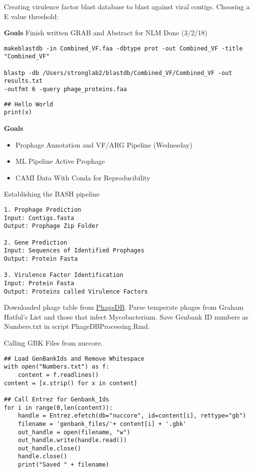 \documentclass[idxtotoc,hyperref,openany,oneside]{labbook} %
\begin{document}
Creating virulence factor blast database to blast against viral contigs. Choosing a E value threshold:


\textbf{Goals}
Finish written GRAB and Abstract for NLM
Done (3/2/18)


\begin{verbatim}
makeblastdb -in Combined_VF.faa -dbtype prot -out Combined_VF -title "Combined_VF"

blastp -db /Users/stronglab2/blastdb/Combined_VF/Combined_VF -out results.txt
-outfmt 6 -query phage_proteins.faa
\end{verbatim}


\begin{lstlisting}
## Hello World 
print(x)
\end{lstlisting} 






\textbf{Goals}
\begin{itemize}
\item Prophage Annotation and VF/ARG Pipeline (Wednesday)
\item ML Pipeline Active Prophage
\item CAMI Data With Conda for Reproducibility
\end{itemize}

Establishing the BASH pipeline

\begin{verbatim}
1. Prophage Prediction
Input: Contigs.fasta
Output: Prophage Zip Folder

2. Gene Prediction
Input: Sequences of Identified Prophages
Output: Protein Fasta

3. Virulence Factor Identification
Input: Protein Fasta
Output: Proteins called Virulence Factors

\end{verbatim}



Downloaded phage table from \href{http://phagesdb.org/data/}{PhageDB}. Parse temperate phages from Graham Hatful's List and those that infect Mycobacterium. Save Genbank ID numbers as Numbers.txt in script PhageDBProcessing.Rmd.



Calling GBK Files from nuccore. 

\begin{lstlisting}
## Load GenBankIds and Remove Whitespace
with open("Numbers.txt") as f:
    content = f.readlines()
content = [x.strip() for x in content]

## Call Entrez for Genbank_Ids
for i in range(0,len(content)):
    handle = Entrez.efetch(db="nuccore", id=content[i], rettype="gb")
    filename = 'genbank_files/'+ content[i] + '.gbk'
    out_handle = open(filename, "w")
    out_handle.write(handle.read())
    out_handle.close()
    handle.close()
    print("Saved " + filename)
\end{lstlisting} 
\end{document}
